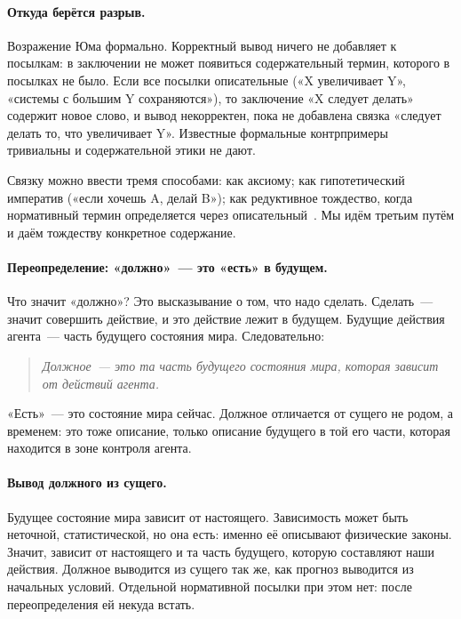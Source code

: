 \documentclass[11pt,a4paper]{article}
\begin{document}
\paragraph{Откуда берётся разрыв.}
Возражение Юма формально. Корректный вывод ничего не добавляет к посылкам: в заключении не может появиться содержательный термин, которого в посылках не было. Если все посылки описательные («X увеличивает Y», «системы с большим Y сохраняются»), то заключение «X следует делать» содержит новое слово, и вывод некорректен, пока не добавлена связка «следует делать то, что увеличивает Y». Известные формальные контрпримеры~\cite{prior1960} тривиальны и содержательной этики не дают.

Связку можно ввести тремя способами: как аксиому; как гипотетический императив («если хочешь A, делай B»); как редуктивное тождество, когда нормативный термин определяется через описательный~\cite{railton1986}. Мы идём третьим путём и даём тождеству конкретное содержание.

\paragraph{Переопределение: «должно»~--- это «есть» в будущем.}
Что значит «должно»? Это высказывание о том, что надо сделать. Сделать~--- значит совершить действие, и это действие лежит в будущем. Будущие действия агента~--- часть будущего состояния мира. Следовательно:

\begin{quote}
\emph{Должное~--- это та часть будущего состояния мира, которая зависит от действий агента.}
\end{quote}

«Есть»~--- это состояние мира сейчас. Должное отличается от сущего не родом, а временем: это тоже описание, только описание будущего в той его части, которая находится в зоне контроля агента.

\paragraph{Вывод должного из сущего.}
Будущее состояние мира зависит от настоящего. Зависимость может быть неточной, статистической, но она есть: именно её описывают физические законы. Значит, зависит от настоящего и та часть будущего, которую составляют наши действия. Должное выводится из сущего так же, как прогноз выводится из начальных условий. Отдельной нормативной посылки при этом нет: после переопределения ей некуда встать.
\end{document}
